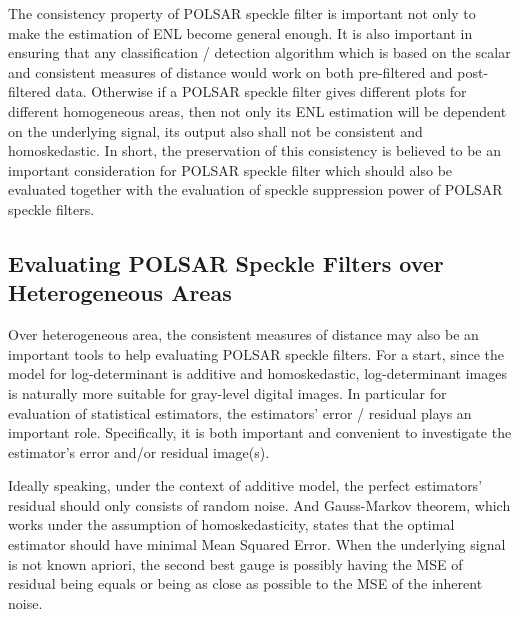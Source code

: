 The consistency property of POLSAR speckle filter is important
  not only to make the estimation of ENL become general enough.
It is also important in ensuring that any classification / detection algorithm
    which is based on the scalar and consistent measures of distance would work on both pre-filtered and post-filtered data.
Otherwise if a POLSAR speckle filter gives different plots for different homogeneous areas,
  then not only its ENL estimation will be dependent on the underlying signal, 
  its output also shall not be consistent and homoskedastic. %
In short, the preservation of this consistency is believed to be an important consideration for POLSAR speckle filter
  which should also be evaluated together with the evaluation of speckle suppression power of POLSAR speckle filters.
  
\subsection{Evaluating POLSAR Speckle Filters over Heterogeneous Areas}

Over heterogeneous area, the consistent measures of distance may also be an important tools to help evaluating POLSAR speckle filters.
For a start, since the model for log-determinant is additive and homoskedastic,
  log-determinant images is naturally more suitable for gray-level digital images.
In particular for evaluation of statistical estimators,
  the estimators' error / residual plays an important role.
Specifically, it is both important and convenient to investigate the estimator's error and/or residual image(s).  

Ideally speaking, under the context of additive model,
  the perfect estimators' residual should only consists of random noise.
And Gauss-Markov theorem, which works under the assumption of homoskedasticity, states that the optimal estimator should have minimal Mean Squared Error.
When the underlying signal is not known apriori,
  the second best gauge is possibly having the MSE of residual being equals or being as close as possible to the MSE of the inherent noise.
  
